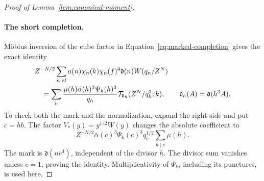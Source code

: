 \documentclass[11pt,a4paper]{article}
\numberwithin{equation}{section}
\numberwithin{figure}{section}
\theoremstyle{definition}
\theoremstyle{remark}
\begin{document}
\begin{proof}[Proof of Lemma~\ref{lem:canonical-moment}]
\paragraph{The short completion.}
M\"obius inversion of the cube factor in
Equation~\eqref{eq:marked-completion} gives the exact identity
\begin{equation}\label{eq:marked-completion-inversion}
 \begin{split}
 &Z^{-N/2}\sum_{n\ {\rm sf}}a(n)\chi_n(k)\chi_n(f)^4
       \mathfrak d(n)W(q_n/Z^N)\\
 &\quad=
 \sum_h\frac{\mu(h)\bar\alpha(h)^3\Psi_k(h)^3}{q_h}
       \mathcal T_{\mathfrak d_h}(Z^N/q_h^3;k),
 \qquad \mathfrak d_h(A)=\mathfrak d(h^3A).
 \end{split}
\end{equation}
To check both the mark and the normalization, expand the right side and
put \(c=hb\).  The factor \(V_*(y)=y^{1/2}W(y)\) changes the absolute
coefficient to
\[
 Z^{-N/2}\bar\alpha(c)^3\Psi_k(c)^3q_c^{1/2}
       \sum_{h\mid c}\mu(h).
\]
The mark is \(\mathfrak d(nc^3)\), independent of the divisor \(h\).
The divisor sum vanishes unless \(c=1\), proving the identity.
Multiplicativity of \(\Psi_k\), including its punctures, is used here.


\end{proof}
\end{document}

